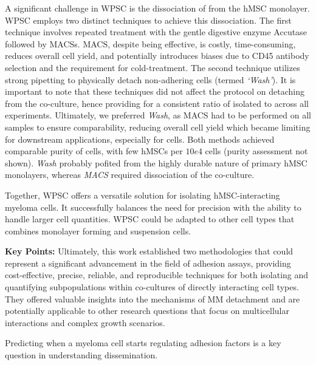 A significant challenge in \ac{WPSC} is the dissociation of \MAina from the hMSC
monolayer. WPSC employs two distinct techniques to achieve this dissociation.
The first technique involves repeated treatment with the gentle digestive enzyme
Accutase followed by \acp{MACS}. \ac{MACS}, despite being effective, is costly,
time-consuming, reduces overall cell yield, and potentially introduces biases
due to CD45 antibody selection and the requirement for cold-treatment. The
second technique utilizes strong pipetting to physically detach non-adhering
cells (termed \emph{`Wash'}). It is important to note that these techniques did
not affect the protocol on detaching \nMAina from the co-culture, hence
providing for a consistent ratio of isolated \MAina to \nMAina across all
experiments. Ultimately, we preferred \emph{Wash}, as \ac{MACS} had to be performed
on all samples to ensure comparability, reducing overall cell yield which became
limiting for downstream applications, especially for \nMAina cells. Both methods
achieved comparable purity of \MAina cells, with few hMSCs per $10e4$
\MAina cells (purity assessment not shown). \emph{Wash} probably pofited from
the highly durable nature of primary hMSC monolayers, whereas \emph{MACS}
required dissociation of the co-culture.

Together, \ac{WPSC} offers a versatile solution for isolating hMSC-interacting
myeloma cells. It successfully balances the need for precision with the ability
to handle larger cell quantities. \ac{WPSC} could be adapted to other cell types
that combines monolayer forming and suspension cells.



\textbf{Key Points:} Ultimately, this work established two methodologies
that could represent a significant advancement in the field of adhesion assays,
providing cost-effective, precise, reliable, and reproducible techniques for
both isolating and quantifying subpopulations within co-cultures of directly
interacting cell types. They offered valuable insights into the mechanisms of MM
detachment and are potentially applicable to other research questions that focus
on multicellular interactions and complex growth scenarios.


%
\label{sec:discussion_order_adhesion}%


Predicting when a myeloma cell starts regulating adhesion factors is a key
question in understanding dissemination.



